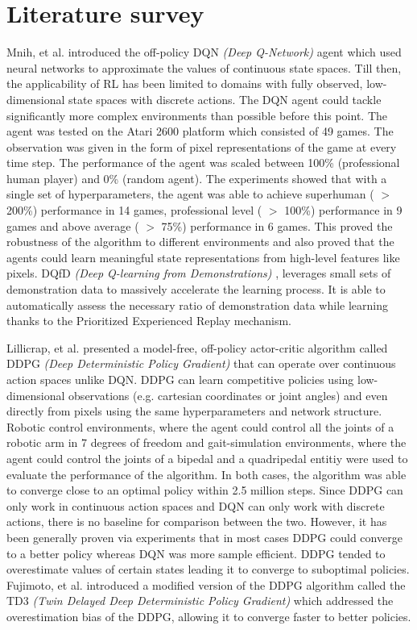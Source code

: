 \documentclass[12pt,a4paper]{article}
\begin{document}
\section{Literature survey}
Mnih, et al. \cite{dqn} introduced the off-policy DQN \textit{(Deep Q-Network)} agent which
used neural networks to approximate the values of continuous state spaces. Till then,
the applicability of RL has been limited to domains with fully observed, low-dimensional
state spaces with discrete actions. The DQN agent could tackle significantly more 
complex environments than possible before this point. The agent was tested on the 
Atari 2600 platform which consisted of 49 games. The observation was given in the 
form of pixel representations of the game at every time step. The performance of the 
agent was scaled between 100\% (professional human player) and 0\% (random agent).
The experiments showed that with a single set of hyperparameters, the agent
was able to achieve superhuman ( $>$ 200\%) performance in 14 games, professional level
( $>$ 100\%) performance in 9 games and above average ( $>$ 75\%) performance in 6 games.
This proved the robustness of the algorithm to different environments and also proved that
the agents could learn meaningful state representations from high-level features like pixels.
DQfD \textit{(Deep Q-learning from Demonstrations)} \cite{dqdf}, leverages small sets of 
demonstration data to massively accelerate the learning process. It is able to 
automatically assess the necessary ratio of demonstration data while 
learning thanks to the Prioritized Experienced Replay \cite{per} mechanism.

Lillicrap, et al. \cite{ddpg} presented a model-free, off-policy actor-critic
algorithm called DDPG \textit{(Deep Deterministic Policy Gradient)} that can operate over continuous action spaces unlike DQN.  
DDPG can learn competitive policies using low-dimensional 
observations (e.g. cartesian coordinates or joint angles) and even directly from pixels 
using the same hyperparameters and network structure. Robotic control environments, where 
the agent could control all the joints of a robotic arm in 7 degrees of freedom and gait-simulation environments, 
where the agent could control the joints of a bipedal and a quadripedal entitiy were used to evaluate the performance
of the algorithm. In both cases, the algorithm was able to converge close to an optimal policy within 2.5 million 
steps. Since DDPG can only work in continuous action spaces and DQN can only work with discrete actions, there
is no baseline for comparison between the two. However, it has been generally proven via experiments that
in most cases DDPG could converge to a better policy whereas DQN was more sample efficient. DDPG tended to overestimate
values of certain states leading it to converge to suboptimal policies. Fujimoto, et al. \cite{td3} introduced
a modified version of the DDPG algorithm called the TD3 \textit{(Twin Delayed Deep Deterministic Policy Gradient)} which addressed the 
overestimation bias of the DDPG, allowing it to converge faster to better policies.
\linebreak
\end{document}

